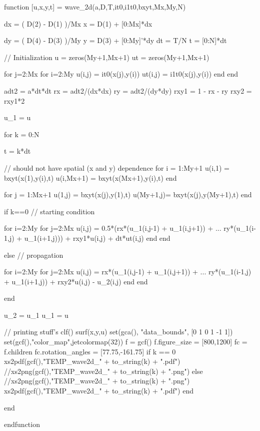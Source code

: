\documentclass[10pt,bahasa]{article}
\begin{document}
\begin{scilabcode}
function [u,x,y,t] = wave_2d(a,D,T,it0,i1t0,bxyt,Mx,My,N)

  dx = ( D(2) - D(1) )/Mx
  x  = D(1) + [0:Mx]*dx

  dy = ( D(4) - D(3) )/My
  y  = D(3) + [0:My]'*dy
  dt = T/N
  t  = [0:N]*dt
  
  // Initialization
  u  = zeros(My+1,Mx+1)
  ut = zeros(My+1,Mx+1)
  
  for j=2:Mx
    for i=2:My
      u(i,j)  = it0(x(j),y(i))
      ut(i,j) = i1t0(x(j),y(i))
    end
  end

  adt2 = a*dt*dt
  rx = adt2/(dx*dx)
  ry = adt2/(dy*dy)
  rxy1 = 1 - rx - ry
  rxy2 = rxy1*2
  
  u_1 = u
  
  for k = 0:N
    
    t = k*dt
    
    // should not have spatial (x and y) dependence
    for i = 1:My+1
      u(i,1) = bxyt(x(1),y(i),t)
      u(i,Mx+1) = bxyt(x(Mx+1),y(i),t)
    end

    for j = 1:Mx+1
      u(1,j) = bxyt(x(j),y(1),t)
      u(My+1,j)= bxyt(x(j),y(My+1),t)
    end
    
    if k==0 // starting condition
  
      for i=2:My
        for j=2:Mx
          u(i,j) = 0.5*(rx*(u_1(i,j-1) + u_1(i,j+1)) + ...
                   ry*(u_1(i-1,j) + u_1(i+1,j))) + rxy1*u(i,j) + dt*ut(i,j)
        end
      end

    else // propagation

      for i=2:My
        for j=2:Mx
          u(i,j) = rx*(u_1(i,j-1) + u_1(i,j+1)) + ...
                   ry*(u_1(i-1,j) + u_1(i+1,j)) + rxy2*u(i,j) - u_2(i,j)
        end
      end
    
    end
    
    u_2 = u_1
    u_1 = u
    
    // printing stuff's
    clf()
    surf(x,y,u)
    set(gca(), "data_bounds", [0 1 0 1 -1 1])
    set(gcf(),"color_map",jetcolormap(32))
    f = gcf()
    f.figure_size = [800,1200]
    fc = f.children
    fc.rotation_angles = [77.75,-161.75]
    if k == 0
      xs2pdf(gcf(),"TEMP_wave2d_" + to_string(k) + ".pdf")
      //xs2png(gcf(),"TEMP_wave2d_" + to_string(k) + ".png")
    else
      //xs2png(gcf(),"TEMP_wave2d_" + to_string(k) + ".png")
      xs2pdf(gcf(),"TEMP_wave2d_" + to_string(k) + ".pdf")
    end

  end

endfunction

\end{scilabcode}
\end{document}
